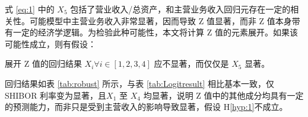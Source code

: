 式 \ref{eq:1} 中的 \(X_{5}\) 包括了营业收入/总资产，和主营业务收入回归元存在一定的相关性。可能模型中主营业务收入非常显著，因而导致 Z 值显著，而非 Z 值本身带有一定的经济学逻辑。为检验此种可能性，本文将计算 Z 值的元素展开。如果该可能性成立，则有假设：

\begin{hyp}
	\label{hyp:1}
	展开 Z 值的回归结果 \(X_i\forall i\in [1,2,3,4] \) 应不显著，而仅仅是 \(X_5\) 显著。
\end{hyp}


回归结果如表
\ref{tab:robust}
所示，与表 \ref{tab:Logitresult} 相比基本一致，仅 SHIBOR 利率变为显著，且\(X_1\) 至 \(X_4\) 均显著，说明 Z 值中的其他成分均具有一定的预测能力，而非只是受到主营收入的影响导致显著，假设 H\ref{hyp:1}不成立。
